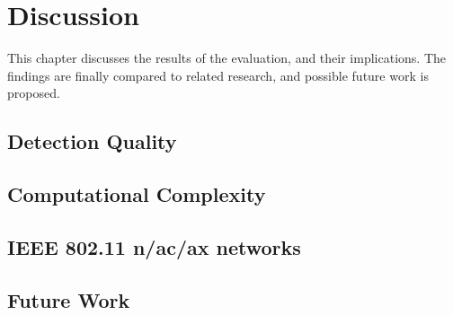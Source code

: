 
\chapter{Discussion}\label{ch:Discussion}
\glsresetall %

This chapter discusses the results of the evaluation, and their implications. The findings are finally compared to related research, and possible future work is proposed.



\section{Detection Quality}



\section{Computational Complexity}



\section{IEEE 802.11 n/ac/ax networks}



\section{Future Work}
